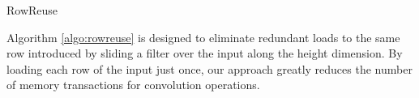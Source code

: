 \begin{algorithm}[t!]
\small
	\caption{RowReuse}
	\label{algo:rowreuse}
\end{algorithm}

Algorithm \ref{algo:rowreuse} is designed to eliminate redundant loads to the same row introduced by sliding a filter over the input along the height dimension.
By loading each row of the input just once, our approach greatly reduces the number of memory transactions for convolution operations.
